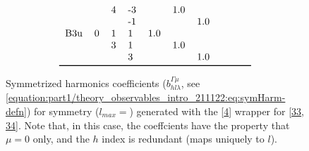 \documentclass[letterpaper,table,10pt,english]{jupyterBook}
\begin{document}
\begin{figure}[htbp]
\begin{equation*}
\begin{split}
\begin{tabular}{llllllllll}
    &   & 4 & -3 &      &  1.0 &      &      &      &      \\
    &   &   & -1 &      &      &  1.0 &      &      &      \\
B3u & 0 & 1 &  1 &  1.0 &      &      &      &      &      \\
    &   & 3 &  1 &      &  1.0 &      &      &      &      \\
    &   &   &  3 &      &      &  1.0 &      &      &      \\
\bottomrule
\end{tabular}\end{split}
\end{equation*}\caption{Symmetrized harmonics coefficients (\(b_{hl\lambda}^{\Gamma\mu}\), see \eqref{equation:part1/theory_observables_intro_211122:eq:symHarm-defn}) for  symmetry (\(l_{max}=\)) generated with the  {[}\hyperlink{cite.backmatter/bibliography:id618}{4}{]} wrapper for  {[}\hyperlink{cite.backmatter/bibliography:id639}{33}, \hyperlink{cite.backmatter/bibliography:id640}{34}{]}. Note that, in this case, the coeffcients have the property that \(\mu=0\) only, and the \(h\) index is redundant (maps uniquely to \(l\)).}\label{\detokenize{part1/theory_tensor_formalism_201122:tab-d2hxlm}}\end{figure}
\end{document}
